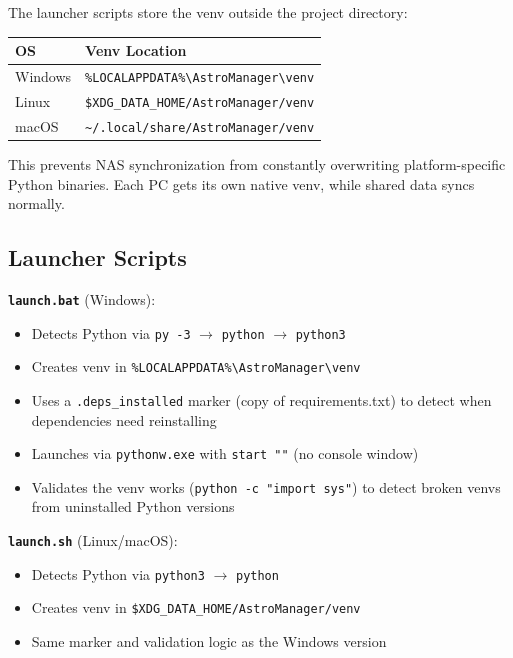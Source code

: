 \documentclass[11pt,a4paper]{article}
\begin{document}
The launcher scripts store the venv outside the project directory:

\begin{center}
\begin{tabular}{ll}
\toprule
\textbf{OS} & \textbf{Venv Location} \\
\midrule
Windows & \texttt{\%LOCALAPPDATA\%\textbackslash AstroManager\textbackslash venv} \\
Linux & \texttt{\$XDG\_DATA\_HOME/AstroManager/venv} \\
macOS & \texttt{\textasciitilde/.local/share/AstroManager/venv} \\
\bottomrule
\end{tabular}
\end{center}

This prevents NAS synchronization from constantly overwriting platform-specific Python binaries. Each PC gets its own native venv, while shared data syncs normally.

\subsection{Launcher Scripts}

\textbf{\texttt{launch.bat}} (Windows):
\begin{itemize}
    \item Detects Python via \texttt{py -3} $\rightarrow$ \texttt{python} $\rightarrow$ \texttt{python3}
    \item Creates venv in \texttt{\%LOCALAPPDATA\%\textbackslash AstroManager\textbackslash venv}
    \item Uses a \texttt{.deps\_installed} marker (copy of requirements.txt) to detect when dependencies need reinstalling
    \item Launches via \texttt{pythonw.exe} with \texttt{start ""} (no console window)
    \item Validates the venv works (\texttt{python -c "import sys"}) to detect broken venvs from uninstalled Python versions
\end{itemize}

\textbf{\texttt{launch.sh}} (Linux/macOS):
\begin{itemize}
    \item Detects Python via \texttt{python3} $\rightarrow$ \texttt{python}
    \item Creates venv in \texttt{\$XDG\_DATA\_HOME/AstroManager/venv}
    \item Same marker and validation logic as the Windows version
\end{itemize}
\end{document}
